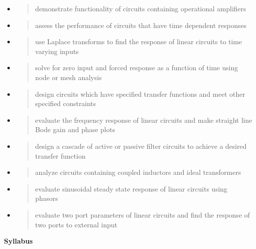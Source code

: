 \begin{itemize}
\item
  \begin{quote}
  demonstrate functionality of circuits containing operational
  amplifiers
  \end{quote}
\item
  \begin{quote}
  assess the performance of circuits that have time dependent responses
  \end{quote}
\item
  \begin{quote}
  use Laplace transforms to find the response of linear circuits to time
  varying inputs
  \end{quote}
\item
  \begin{quote}
  solve for zero input and forced response as a function of time using
  node or mesh analysis
  \end{quote}
\item
  \begin{quote}
  design circuits which have specified transfer functions and meet other
  specified constraints
  \end{quote}
\item
  \begin{quote}
  evaluate the frequency response of linear circuits and make straight
  line Bode gain and phase plots
  \end{quote}
\item
  \begin{quote}
  design a cascade of active or passive filter circuits to achieve a
  desired transfer function
  \end{quote}
\item
  \begin{quote}
  analyze circuits containing coupled inductors and ideal transformers
  \end{quote}
\item
  \begin{quote}
  evaluate sinusoidal steady state response of linear circuits using
  phasors
  \end{quote}
\item
  \begin{quote}
  evaluate two port parameters of linear circuits and find the response
  of two ports to external input
  \end{quote}
\end{itemize}

\textbf{Syllabus}

